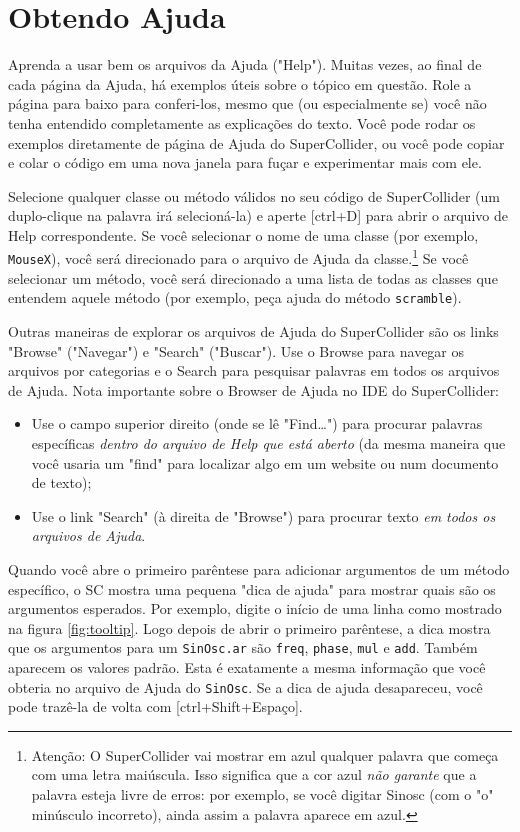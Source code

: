 \section{Obtendo Ajuda}

Aprenda a usar bem os arquivos da Ajuda ("Help"). Muitas vezes, ao final de cada página da Ajuda, há exemplos úteis sobre o tópico em questão.  Role a página para baixo para conferi-los, mesmo que (ou especialmente se) você não tenha entendido completamente as explicações do texto. Você pode rodar os exemplos diretamente de página de Ajuda do SuperCollider, ou você pode copiar e colar o código em uma nova janela para fuçar e experimentar mais com ele. 

Selecione qualquer classe ou método válidos no seu código de SuperCollider (um duplo-clique na palavra irá selecioná-la) e aperte [ctrl+D] para abrir o arquivo de Help correspondente. Se você selecionar o nome de uma classe (por exemplo, \texttt{MouseX}), você será direcionado para o arquivo de Ajuda da classe.\footnote{Atenção: O SuperCollider vai mostrar em azul qualquer palavra que começa com uma letra maiúscula. Isso significa que a cor azul \emph{não garante} que a palavra esteja livre de erros: por exemplo, se você digitar Sinosc (com o "o" minúsculo incorreto), ainda assim a palavra aparece em azul.} Se você selecionar um método, você será direcionado a uma lista de todas as classes que entendem aquele método (por exemplo, peça ajuda do método \texttt{scramble}).

Outras maneiras de explorar os arquivos de Ajuda do SuperCollider são os links "Browse" ("Navegar") e "Search" ("Buscar"). Use o Browse para navegar os arquivos por categorias e o Search para pesquisar palavras em todos os arquivos de Ajuda.
Nota importante sobre o Browser de Ajuda no IDE do SuperCollider:

\begin{itemize}
\item Use o campo superior direito (onde se lê "Find…") para procurar palavras específicas \emph{dentro do arquivo de Help que está aberto} (da mesma maneira que você usaria um "find" para localizar algo em um website ou num documento de texto);
\item Use o link "Search" (à direita de "Browse") para procurar texto \emph{em todos os arquivos de Ajuda}.
\end{itemize}

Quando você abre o primeiro parêntese para adicionar argumentos de um método específico, o SC mostra uma pequena "dica de ajuda" para mostrar quais são os argumentos esperados. Por exemplo, digite o início de uma linha como mostrado na figura \ref{fig:tooltip}. Logo depois de abrir o primeiro parêntese, a dica mostra que os argumentos para um \texttt{SinOsc.ar} são \texttt{freq}, \texttt{phase}, \texttt{mul} e \texttt{add}. Também aparecem os valores padrão. Esta é exatamente a mesma informação que você obteria no arquivo de Ajuda do \texttt{SinOsc}. Se a dica de ajuda desapareceu, você pode trazê-la de volta com [ctrl+Shift+Espaço].

